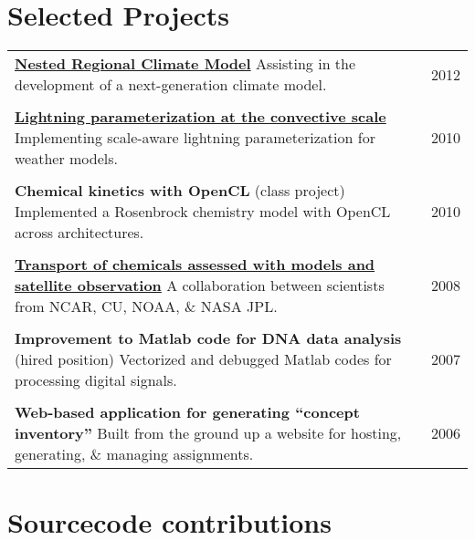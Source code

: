 \documentclass[centered,11pt,line]{res}
\makeatletter
\newcommand{\tabulated}{\begin{tabular}{@{}p{5.5in}p{0.8in}}}
\newcommand{\shrink}{\vspace{-.15in}}
\makeatother
\begin{document}
\begin{resume}
		\section{\sc Selected Projects}
		\tabulated
			\href{http://www.nrcm.ucar.edu}{\bf Nested Regional Climate Model} \newline
			Assisting in the development of a next-generation climate model. & 2012 \\ \\
			\href{http://www.geosci-model-dev.net/6/429/2013/}{\bf Lightning parameterization at the convective scale} \newline
			Implementing scale-aware lightning parameterization for weather models. & 2010 \\ \\
			{\bf Chemical kinetics with OpenCL} (class project) \newline
			Implemented a Rosenbrock chemistry model with OpenCL across architectures. & 2010 \\ \\
			\href{www.atmos-chem-phys.net/12/11003/2012/}{\bf Transport of chemicals assessed with models and satellite observation} \newline
			A collaboration between scientists from NCAR, CU, NOAA, \& NASA JPL. & 2008 \\ \\
			{\bf Improvement to Matlab code for DNA data analysis} (hired position) \newline
			Vectorized and debugged Matlab codes for processing digital signals. & 2007 \\ \\
			{\bf Web-based application for generating ``concept inventory''}\newline
			Built from the ground up a website for hosting, generating, \& managing assignments. & 2006
		\end{tabular}\shrink
		
		\section{\sc Sourcecode contributions}
		

\end{resume}
\end{document}
